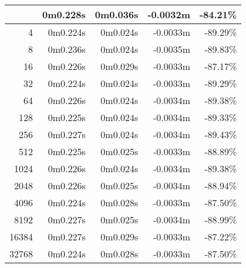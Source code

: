 \documentclass[documentation.tex]{subfiles}
\begin{document}
\begin{longtable}{|r|r|r|r|r|}
    \hline \hline
    \endlastfoot
    \hline
    2                   & 0m0.228s          & 0m0.036s          & {\color[HTML]{FF0000} -0.0032m} & {\color[HTML]{FF0000} -84.21\%} \\ \hline
    4                   & 0m0.224s          & 0m0.024s          & {\color[HTML]{FF0000} -0.0033m} & {\color[HTML]{FF0000} -89.29\%} \\ \hline
    8                   & 0m0.236s          & 0m0.024s          & {\color[HTML]{FF0000} -0.0035m} & {\color[HTML]{FF0000} -89.83\%} \\ \hline
    16                  & 0m0.226s          & 0m0.029s          & {\color[HTML]{FF0000} -0.0033m} & {\color[HTML]{FF0000} -87.17\%} \\ \hline
    32                  & 0m0.224s          & 0m0.024s          & {\color[HTML]{FF0000} -0.0033m} & {\color[HTML]{FF0000} -89.29\%} \\ \hline
    64                  & 0m0.226s          & 0m0.024s          & {\color[HTML]{FF0000} -0.0034m} & {\color[HTML]{FF0000} -89.38\%} \\ \hline
    128                 & 0m0.225s          & 0m0.024s          & {\color[HTML]{FF0000} -0.0034m} & {\color[HTML]{FF0000} -89.33\%} \\ \hline
    256                 & 0m0.227s          & 0m0.024s          & {\color[HTML]{FF0000} -0.0034m} & {\color[HTML]{FF0000} -89.43\%} \\ \hline
    512                 & 0m0.225s          & 0m0.025s          & {\color[HTML]{FF0000} -0.0033m} & {\color[HTML]{FF0000} -88.89\%} \\ \hline
    1024                & 0m0.226s          & 0m0.024s          & {\color[HTML]{FF0000} -0.0034m} & {\color[HTML]{FF0000} -89.38\%} \\ \hline
    2048                & 0m0.226s          & 0m0.025s          & {\color[HTML]{FF0000} -0.0034m} & {\color[HTML]{FF0000} -88.94\%} \\ \hline
    4096                & 0m0.224s          & 0m0.028s          & {\color[HTML]{FF0000} -0.0033m} & {\color[HTML]{FF0000} -87.50\%} \\ \hline
    8192                & 0m0.227s          & 0m0.025s          & {\color[HTML]{FF0000} -0.0034m} & {\color[HTML]{FF0000} -88.99\%} \\ \hline
    16384               & 0m0.227s          & 0m0.029s          & {\color[HTML]{FF0000} -0.0033m} & {\color[HTML]{FF0000} -87.22\%} \\ \hline
    32768               & 0m0.224s          & 0m0.028s          & {\color[HTML]{FF0000} -0.0033m} & {\color[HTML]{FF0000} -87.50\%} \\ \hline

\end{longtable}
\end{document}
